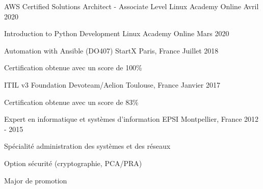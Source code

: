 

\begin{cventries}

  \cventry
    {AWS Certified Solutions Architect - Associate Level} %
    {Linux Academy} %
    {Online} %
    {Avril 2020} %
    {}

  \cventry
    {Introduction to Python Development} %
    {Linux Academy} %
    {Online} %
    {Mars 2020} %
    {}

  \cventry
    {Automation with Ansible (DO407)} %
    {StartX} %
    {Paris, France} %
    {Juillet 2018} %
    {
      \begin{cvitems} %
        \item {Certification obtenue avec un score de 100\%}
      \end{cvitems}
    }

\cventry
{ITIL v3 Foundation} %
{Devoteam/Aelion} %
{Toulouse, France} %
{Janvier 2017} %
{
  \begin{cvitems} %
    \item {Certification obtenue avec un score de 83\%}
  \end{cvitems}
}

\cventry
{Expert en informatique et systèmes d'information} %
{EPSI} %
{Montpellier, France} %
{2012 - 2015} %
{
  \begin{cvitems} %
    \item {Spécialité administration des systèmes et des réseaux}
    \item {Option sécurité (cryptographie, PCA/PRA)}
    \item {Major de promotion}
  \end{cvitems}
}


\end{cventries}
